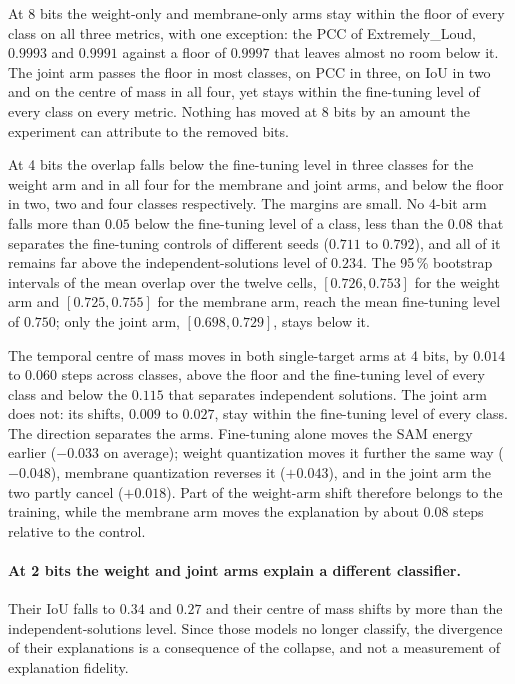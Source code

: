 At 8 bits the weight-only and membrane-only arms stay within the floor of every
class on all three metrics, with one exception: the PCC of Extremely\_Loud,
$0.9993$ and $0.9991$ against a floor of $0.9997$ that leaves almost no room
below it. The joint arm passes the floor in most classes, on PCC in three, on IoU
in two and on the centre of mass in all four, yet stays within the fine-tuning
level of every class on every metric. Nothing has moved at 8 bits by an amount
the experiment can attribute to the removed bits.

At 4 bits the overlap falls below the fine-tuning level in three classes for the
weight arm and in all four for the membrane and joint arms, and below the floor
in two, two and four classes respectively. The margins are small. No 4-bit arm
falls more than $0.05$ below the fine-tuning level of a class, less than the
$0.08$ that separates the fine-tuning controls of different seeds ($0.711$ to
$0.792$), and all of it remains far above the independent-solutions level of
$0.234$. The 95\,\% bootstrap intervals of the mean overlap over the twelve
cells, $[0.726, 0.753]$ for the weight arm and $[0.725, 0.755]$ for the membrane
arm, reach the mean fine-tuning level of $0.750$; only the joint arm,
$[0.698, 0.729]$, stays below it.

The temporal centre of mass moves in both single-target arms at 4 bits, by
$0.014$ to $0.060$ steps across classes, above the floor and the fine-tuning
level of every class and below the $0.115$ that separates independent solutions.
The joint arm does not: its shifts, $0.009$ to $0.027$, stay within the
fine-tuning level of every class. The direction separates the arms. Fine-tuning
alone moves the SAM energy earlier ($-0.033$ on average); weight quantization
moves it further the same way ($-0.048$), membrane quantization reverses it
($+0.043$), and in the joint arm the two partly cancel ($+0.018$). Part of the
weight-arm shift therefore belongs to the training, while the membrane arm moves
the explanation by about $0.08$ steps relative to the control.

\paragraph{At 2 bits the weight and joint arms explain a different classifier.}
Their IoU falls to $0.34$ and $0.27$ and their centre of mass shifts by more
than the independent-solutions level. Since those models no longer classify, the
divergence of their explanations is a consequence of the collapse, and not a
measurement of explanation fidelity.


